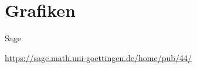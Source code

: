 \documentclass[hyperref={xetex}]{beamer}
\begin{document}
% 


\section{Grafiken}



\begin{frame}{Sage}
    \begin{center}
        \url{https://sage.math.uni-goettingen.de/home/pub/44/}
    \end{center}
\end{frame}
\end{document}
